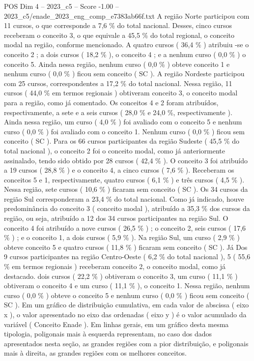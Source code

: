 \begin{textsample}{POS Dim 4 – 2023\_c5 – Score -1.00 – 2023\_c5/enade\_2023\_eng\_comp\_e7383ab66f.txt}
A região Norte participou com 11 cursos, o que corresponde a 7,6 \% do total nacional.
Desses, cinco cursos receberam o conceito 3, o que equivale a 45,5 \% do total regional, o conceito modal na região, conforme mencionado.
A quatro cursos ( 36,4 \% ) atribuiu -se o conceito 2 ; a dois cursos ( 18,2 \% ), o conceito 4 ; e a nenhum curso ( 0,0 \% ) o conceito 5.
Ainda nessa região, nenhum curso ( 0,0 \% ) obteve conceito 1 e nenhum curso ( 0,0 \% ) ficou sem conceito ( SC ).
A região Nordeste participou com 25 cursos, correspondentes a 17,2 \% do total nacional.
Nessa região, 11 cursos ( 44,0 \% em termos regionais ) obtiveram conceito 3, o conceito modal para a região, como já comentado.
Os conceitos 4 e 2 foram atribuídos, respectivamente, a sete e a seis cursos ( 28,0 \% e 24,0 \%, respectivamente ).
Ainda nessa região, um curso ( 4,0 \% ) foi avaliado com o conceito 5 e nenhum curso ( 0,0 \% ) foi avaliado com o conceito 1.
Nenhum curso ( 0,0 \% ) ficou sem conceito ( SC ).
Para os 66 cursos participantes da região Sudeste ( 45,5 \% do total nacional ), o conceito 2 foi o conceito modal, como já anteriormente assinalado, tendo sido obtido por 28 cursos ( 42,4 \% ).
O conceito 3 foi atribuído a 19 cursos ( 28,8 \% ) e o conceito 4, a cinco cursos ( 7,6 \% ).
Receberam os conceitos 5 e 1, respectivamente, quatro cursos ( 6,1 \% ) e três cursos ( 4,5 \% ).
Nessa região, sete cursos ( 10,6 \% ) ficaram sem conceito ( SC ).
Os 34 cursos da região Sul corresponderam a 23,4 \% do total nacional.
Como já indicado, houve predominância do conceito 3 ( conceito modal ), atribuído a 35,3 \% dos cursos da região, ou seja, atribuído a 12 dos 34 cursos participantes na região Sul.
O conceito 4 foi atribuído a nove cursos ( 26,5 \% ) ; o conceito 2, seis cursos ( 17,6 \% ) ; e o conceito 1, a dois cursos ( 5,9 \% ).
Na região Sul, um curso ( 2,9 \% ) obteve conceito 5 e quatro cursos ( 11,8 \% ) ficaram sem conceito ( SC ).
Já Dos 9 cursos participantes na região Centro-Oeste ( 6,2 \% do total nacional ), 5 ( 55,6 \% em termos regionais ) receberam conceito 2, o conceito modal, como já destacado. dois cursos ( 22,2 \% ) obtiveram o conceito 3, um curso ( 11,1 \% ) obtiveram o conceito 4 e um curso ( 11,1 \% ), o conceito 1.
Nessa região, nenhum curso ( 0,0 \% ) obteve o conceito 5 e nenhum curso ( 0,0 \% ) ficou sem conceito ( SC ).
Em um gráfico de distribuição cumulativa, em cada valor de abscissa ( eixo x ), o valor apresentado no eixo das ordenadas ( eixo y ) é o valor acumulado da variável ( Conceito Enade ).
Em linhas gerais, em um gráfico desta mesma tipologia, poligonais mais à esquerda representam, no caso dos dados apresentados nesta seção, as grandes regiões com a pior distribuição, e poligonais mais à direita, as grandes regiões com os melhores conceitos.

\end{textsample}
